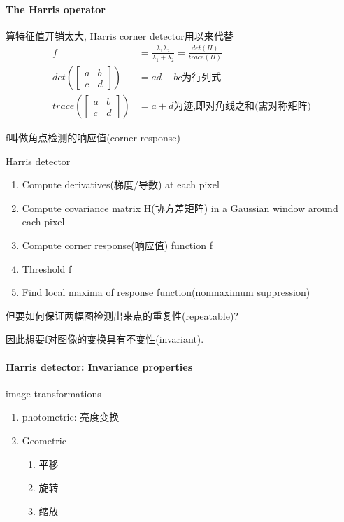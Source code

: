 \paragraph{The Harris operator}

算特征值开销太大, Harris corner detector用以来代替
\begin{align*}
    f&=\frac{\lambda_1\lambda_2}{\lambda_1+\lambda_2}=\frac{det(H)}{trace(H)}\\
    det(\begin{bmatrix}
        a&b\\c&d
    \end{bmatrix})&=ad-bc\text{为行列式}\\
    trace(\begin{bmatrix}
        a&b\\c&d
    \end{bmatrix})&=a+d\text{为迹,即对角线之和(需对称矩阵)}
\end{align*}

f叫做角点检测的响应值(corner response)

Harris detector
\begin{enumerate}
    \item Compute derivatives(梯度/导数) at each pixel
    \item Compute covariance matrix H(协方差矩阵) in a Gaussian window around each pixel
    \item Compute corner response(响应值) function f
    \item Threshold f
    \item Find local maxima of response function(nonmaximum suppression)
\end{enumerate}

但要如何保证两幅图检测出来点的重复性(repeatable)?

因此想要f对图像的变换具有不变性(invariant).

\paragraph{Harris detector: Invariance properties}
image transformations
\begin{enumerate}
    \item photometric: 亮度变换
    \item Geometric
    \begin{enumerate}
        \item 平移
        \item 旋转
        \item 缩放
    \end{enumerate}
\end{enumerate}

